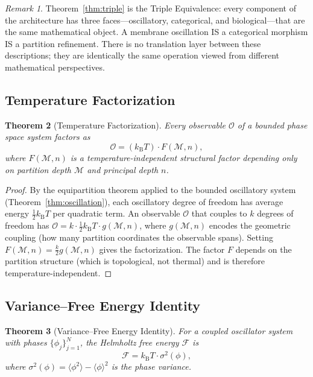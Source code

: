 \documentclass[twocolumn,10pt]{article}
\newtheorem{theorem}{Theorem}[section]
\theoremstyle{remark}
\newtheorem{remark}[theorem]{Remark}
\newcommand{\kB}{k_{\mathrm{B}}}
\newcommand{\Depth}{\mathcal{M}}
\begin{document}
\begin{remark}
\label{rem:triple_meaning}
Theorem~\ref{thm:triple} is the Triple Equivalence: every component of the architecture has three faces---oscillatory, categorical, and biological---that are the same mathematical object. A membrane oscillation IS a categorical morphism IS a partition refinement. There is no translation layer between these descriptions; they are identically the same operation viewed from different mathematical perspectives.
\end{remark}

\subsection{Temperature Factorization}

\begin{theorem}[Temperature Factorization]
\label{thm:temp_factor}
Every observable $\mathcal{O}$ of a bounded phase space system factors as
\begin{equation}
\mathcal{O} = (\kB T) \cdot F(\Depth, n),
\label{eq:temp_factor}
\end{equation}
where $F(\Depth, n)$ is a temperature-independent structural factor depending only on partition depth $\Depth$ and principal depth $n$.
\end{theorem}

\begin{proof}
By the equipartition theorem applied to the bounded oscillatory system (Theorem~\ref{thm:oscillation}), each oscillatory degree of freedom has average energy $\tfrac{1}{2}\kB T$ per quadratic term. An observable $\mathcal{O}$ that couples to $k$ degrees of freedom has $\mathcal{O} = k \cdot \tfrac{1}{2}\kB T \cdot g(\Depth, n)$, where $g(\Depth, n)$ encodes the geometric coupling (how many partition coordinates the observable spans). Setting $F(\Depth, n) = \tfrac{k}{2} g(\Depth, n)$ gives the factorization. The factor $F$ depends on the partition structure (which is topological, not thermal) and is therefore temperature-independent.
\end{proof}

\subsection{Variance--Free Energy Identity}

\begin{theorem}[Variance--Free Energy Identity]
\label{thm:variance_free}
For a coupled oscillator system with phases $\{\phi_j\}_{j=1}^N$, the Helmholtz free energy $\mathcal{F}$ is
\begin{equation}
\mathcal{F} = \kB T \cdot \sigma^2(\phi),
\label{eq:variance_free}
\end{equation}
where $\sigma^2(\phi) = \langle \phi^2 \rangle - \langle \phi \rangle^2$ is the phase variance.
\end{theorem}
\end{document}
